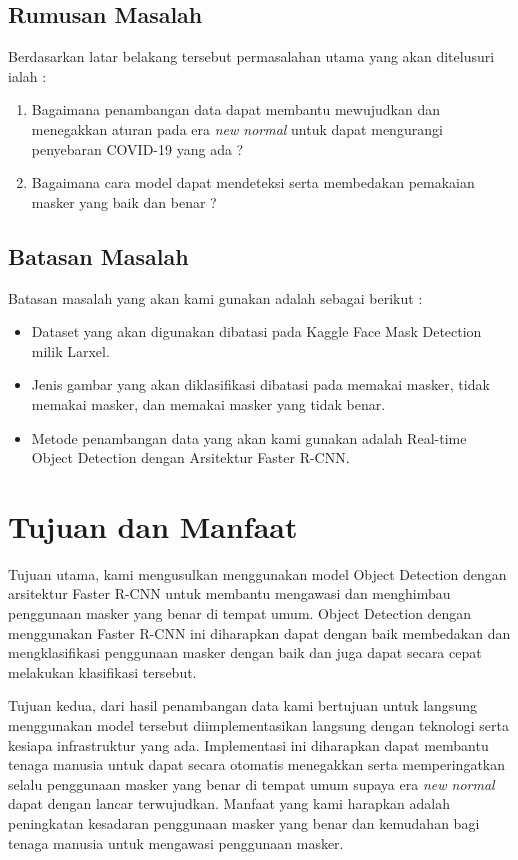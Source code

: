 \documentclass{article}
\begin{document}
  	\subsection{Rumusan Masalah}
  		Berdasarkan latar belakang tersebut permasalahan utama yang akan ditelusuri ialah :
  		\begin{enumerate}
  			\item Bagaimana penambangan data dapat membantu mewujudkan dan menegakkan aturan pada era \textit{new normal} untuk dapat mengurangi penyebaran COVID-19 yang ada ?
  			\item Bagaimana cara model dapat mendeteksi serta membedakan pemakaian masker yang baik dan benar ?

  		\end{enumerate}
  	\subsection{Batasan Masalah}
  		Batasan masalah yang akan kami gunakan adalah sebagai berikut :
  		\begin{itemize}
  			\item Dataset yang akan digunakan dibatasi pada Kaggle Face Mask Detection milik Larxel\cite{larxel_2020}.
  			\item Jenis gambar yang akan diklasifikasi dibatasi pada memakai masker, tidak memakai masker, dan memakai masker yang tidak benar.
  			\item Metode penambangan data yang akan kami gunakan adalah Real-time Object Detection dengan Arsitektur Faster R-CNN\cite{NIPS2015_14bfa6bb}.
  		\end{itemize}
  \section{Tujuan dan Manfaat}
  		\par Tujuan utama, kami mengusulkan menggunakan model Object Detection dengan arsitektur Faster R-CNN untuk membantu mengawasi dan menghimbau penggunaan masker yang benar di tempat umum. Object Detection dengan menggunakan Faster R-CNN ini diharapkan dapat dengan baik membedakan dan mengklasifikasi penggunaan masker dengan baik dan juga dapat secara cepat melakukan klasifikasi tersebut.
  		
  		\par Tujuan kedua, dari hasil penambangan data kami bertujuan untuk langsung menggunakan model tersebut diimplementasikan langsung dengan teknologi serta kesiapa infrastruktur yang ada. Implementasi ini diharapkan dapat membantu tenaga manusia untuk dapat secara otomatis menegakkan serta memperingatkan selalu penggunaan masker yang benar di tempat umum supaya era \textit{new normal} dapat dengan lancar terwujudkan. Manfaat yang kami harapkan adalah peningkatan kesadaran penggunaan masker yang benar dan kemudahan bagi tenaga manusia untuk mengawasi penggunaan masker.
\end{document}
